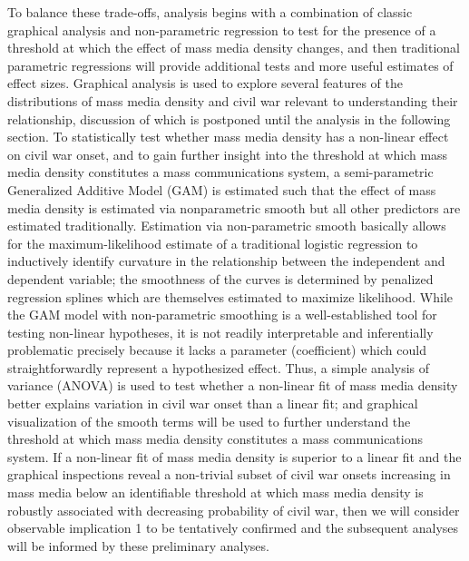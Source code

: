 \documentclass[11pt,article,oneside]{memoir}
\begin{document}
To balance these trade-offs, analysis begins with a combination of
classic graphical analysis and non-parametric regression to test for the
presence of a threshold at which the effect of mass media density
changes, and then traditional parametric regressions will provide
additional tests and more useful estimates of effect sizes. Graphical
analysis is used to explore several features of the distributions of
mass media density and civil war relevant to understanding their
relationship, discussion of which is postponed until the analysis in the
following section. To statistically test whether mass media density has
a non-linear effect on civil war onset, and to gain further insight into
the threshold at which mass media density constitutes a mass
communications system, a semi-parametric Generalized Additive Model
(GAM) is estimated such that the effect of mass media density is
estimated via nonparametric smooth but all other predictors are
estimated traditionally. Estimation via non-parametric smooth basically
allows for the maximum-likelihood estimate of a traditional logistic
regression to inductively identify curvature in the relationship between
the independent and dependent variable; the smoothness of the curves is
determined by penalized regression splines which are themselves
estimated to maximize likelihood. While the GAM model with
non-parametric smoothing is a well-established tool for testing
non-linear hypotheses, it is not readily interpretable and inferentially
problematic precisely because it lacks a parameter (coefficient) which
could straightforwardly represent a hypothesized effect. Thus, a simple
analysis of variance (ANOVA) is used to test whether a non-linear fit of
mass media density better explains variation in civil war onset than a
linear fit; and graphical visualization of the smooth terms will be used
to further understand the threshold at which mass media density
constitutes a mass communications system. If a non-linear fit of mass
media density is superior to a linear fit and the graphical inspections
reveal a non-trivial subset of civil war onsets increasing in mass media
below an identifiable threshold at which mass media density is robustly
associated with decreasing probability of civil war, then we will
consider observable implication 1 to be tentatively confirmed and the
subsequent analyses will be informed by these preliminary analyses.
\end{document}
